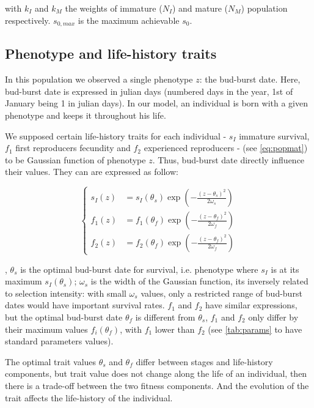 with $k_{I}$ and $k_{M}$ the weights of immature ($N_{I}$) and mature ($N_{M}$) population respectively. $s_{0, max}$ is the maximum achievable $s_{0}$.

\subsection*{Phenotype and life-history traits}

In this population we observed a single phenotype $z$: the bud-burst date. Here, bud-burst date is expressed in julian days (numbered days in the year, 1st of January being 1 in julian days). In our model, an individual is born with a given phenotype and keeps it throughout his life.

We supposed certain life-history traits for each individual - $s_{I}$ immature survival, $f_1$ first reproducers fecundity and $f_2$ experienced reproducers - (see \autoref{eq:popmat}) to be Gaussian function of phenotype $z$. Thus, bud-burst date directly influence their values. They can are expressed as follow:

\begin{equation}
	\label{eq:indlht}
	\left\{
	\begin{aligned}
	s_{I}(z) &= s_{I}(\theta_{s})	\exp\left(-\frac{(z - \theta_{s})^2}{2\omega_{s}}\right) \\
	f_1(z) &= f_1(\theta_{f})	\exp\left(-\frac{(z - \theta_{f})^2}{2\omega_{f}}\right) \\
	f_2(z) &= f_2(\theta_{f})	\exp\left(-\frac{(z - \theta_{f})^2}{2\omega_{f}}\right)
	\end{aligned}
	\right.
\end{equation}


, $\theta_s$ is the optimal bud-burst date for survival, i.e. phenotype where $s_I$ is at its maximum $s_I(\theta_s)$; $\omega_s$ is the width of the Gaussian function, its inversely related to selection intensity: with small $\omega_s$ values, only a restricted range of bud-burst dates would have important survival rates. $f_1$ and $f_2$ have similar expressions, but the optimal bud-burst date $\theta_f$ is different from $\theta_s$, $f_1$ and $f_2$ only differ by their maximum values $f_i(\theta_f)$, with $f_1$ lower than $f_2$ (see \autoref{tab:params} to have standard parameters values).

The optimal trait values $\theta_s$ and $\theta_f$ differ between stages and life-history components, but trait value does not change along the life of an individual, then there is a trade-off between the two fitness components. And the evolution of the trait affects the life-history of the individual.

